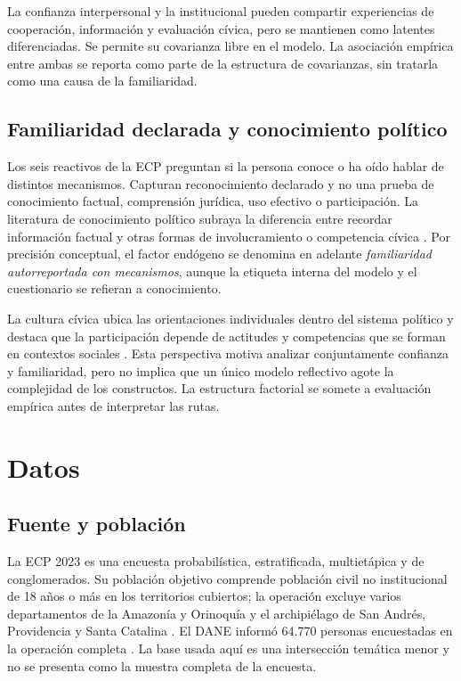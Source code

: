 \documentclass[11pt,letterpaper]{article}
\begin{document}
La confianza interpersonal y la institucional pueden compartir experiencias de cooperación, información y evaluación cívica, pero se mantienen como latentes diferenciadas. Se permite su covarianza libre en el modelo. La asociación empírica entre ambas se reporta como parte de la estructura de covarianzas, sin tratarla como una causa de la familiaridad.

\subsection{Familiaridad declarada y conocimiento político}

Los seis reactivos de la ECP preguntan si la persona conoce o ha oído hablar de distintos mecanismos. Capturan reconocimiento declarado y no una prueba de conocimiento factual, comprensión jurídica, uso efectivo o participación. La literatura de conocimiento político subraya la diferencia entre recordar información factual y otras formas de involucramiento o competencia cívica \citep{DelliCarpiniKeeter1996}. Por precisión conceptual, el factor endógeno se denomina en adelante \emph{familiaridad autorreportada con mecanismos}, aunque la etiqueta interna del modelo y el cuestionario se refieran a conocimiento.

La cultura cívica ubica las orientaciones individuales dentro del sistema político y destaca que la participación depende de actitudes y competencias que se forman en contextos sociales \citep{AlmondVerba1963}. Esta perspectiva motiva analizar conjuntamente confianza y familiaridad, pero no implica que un único modelo reflectivo agote la complejidad de los constructos. La estructura factorial se somete a evaluación empírica antes de interpretar las rutas.

\section{Datos}
\label{sec:datos}

\subsection{Fuente y población}

La ECP 2023 es una encuesta probabilística, estratificada, multietápica y de conglomerados. Su población objetivo comprende población civil no institucional de 18 años o más en los territorios cubiertos; la operación excluye varios departamentos de la Amazonía y Orinoquía y el archipiélago de San Andrés, Providencia y Santa Catalina \citep{DANE2024Boletin,DANEECP2023}. El DANE informó 64.770 personas encuestadas en la operación completa \citep{DANE2024Boletin}. La base usada aquí es una intersección temática menor y no se presenta como la muestra completa de la encuesta.
\end{document}
